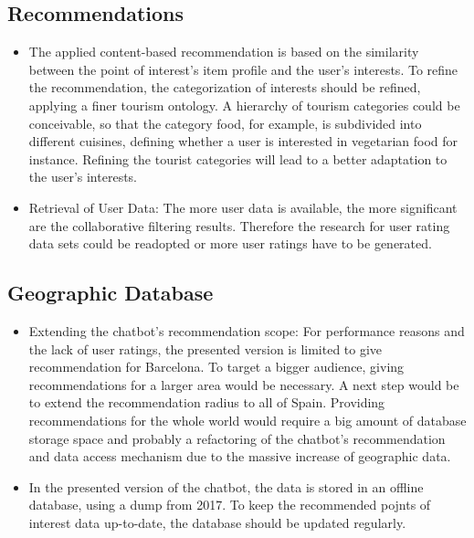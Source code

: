 \subsection{Recommendations}
\begin{itemize}
\item The applied content-based recommendation is based on the similarity between the point of interest’s item profile and the user’s interests. To refine the recommendation, the categorization of interests should be refined, applying a finer tourism ontology. A hierarchy of tourism categories could be conceivable, so that the category food, for example, is subdivided into different cuisines, defining whether a user is interested in vegetarian food for instance. Refining the tourist categories will lead to a better adaptation to the user’s interests.

\item Retrieval of User Data: The more user data is available, the more significant are the collaborative filtering results. Therefore the research for user rating data sets could be readopted or more user ratings have to be generated.
\end{itemize}

\subsection{Geographic Database}
\begin{itemize}
\item Extending the chatbot’s recommendation scope: For performance reasons and the lack of user ratings, the presented version is limited to give recommendation for Barcelona. To target a bigger audience, giving recommendations for a larger area would be necessary. A next step would be to extend the recommendation radius to all of Spain. Providing recommendations for the whole world would require a big amount of database storage space and probably a refactoring of the chatbot’s recommendation and data access mechanism due to the massive increase of geographic data. 

\item In the presented version of the chatbot, the data is stored in an offline database, using a dump from 2017. To keep the recommended pojnts of interest data up-to-date, the database should be updated regularly. 
\end{itemize}
